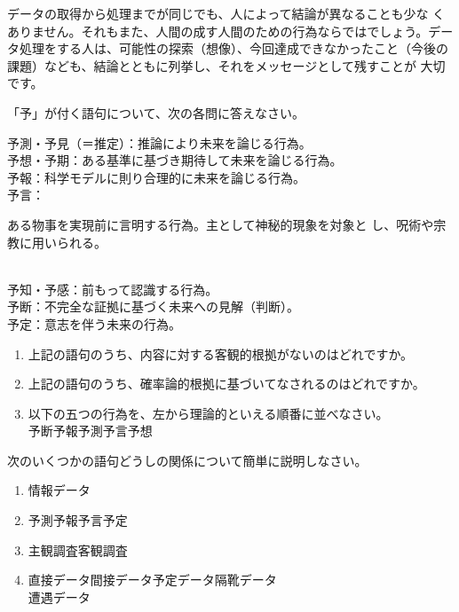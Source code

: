  データの取得から処理までが同じでも、人によって結論が異なることも少な くありません。それもまた、人間の成す人間のための行為ならではでしょう。データ処理をする人は、可能性の探索（想像）、今回達成できなかったこと（今後の課題）なども、結論とともに列挙し、それをメッセージとして残すことが 大切です。

\begin{exercise}
    \item{}
    「予」が付く語句について、次の各問に答えなさい。
    
    \begin{adjustwidth}{2.5em}{0em}
    予測・予見（＝推定）：推論により未来を論じる行為。\\
    予想・予期：ある基準に基づき期待して未来を論じる行為。\\
    予報：科学モデルに則り合理的に未来を論じる行為。 \\
    予言：\parbox[t][27pt]{\textwidth-8.5em}{ある物事を実現前に言明する行為。主として神秘的現象を対象と し、呪術や宗教に用いられる。}\\
    予知・予感：前もって認識する行為。\\
    予断：不完全な証拠に基づく未来への見解（判断）。\\
    予定：意志を伴う未来の行為。
    \end{adjustwidth}
    \begin{enumerate}[label=(\arabic*), leftmargin=2.25em, labelsep=.75em, parsep=0pt, itemsep=0pt, topsep=0pt]
        \item 上記の語句のうち、内容に対する客観的根拠がないのはどれですか。
        \item 上記の語句のうち、確率論的根拠に基づいてなされるのはどれですか。
        \item 以下の五つの行為を、左から理論的といえる順番に並べなさい。\\
        予断\qquad 予報\qquad 予測\qquad 予言\qquad 予想
    \end{enumerate}
    
    \item{}
    次のいくつかの語句どうしの関係について簡単に説明しなさい。
    \begin{enumerate}[label=(\arabic*), leftmargin=2.25em, labelsep=.75em, parsep=0pt, itemsep=0pt]
        \item 情報\qquad データ
        \item 予測\qquad 予報\qquad 予言\qquad 予定
        \item 主観調査\qquad 客観調査
        \item 直接データ\qquad 間接データ\qquad 予定データ\qquad 隔靴データ\\
        遭遇データ
    \end{enumerate}


\end{exercise}
